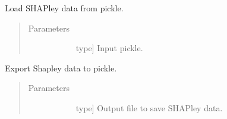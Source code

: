 \documentclass[letterpaper,10pt,english]{sphinxmanual}
\begin{document}
\begin{fulllineitems}

\begin{fulllineitems}
\label{\detokenize{index:methylnet.interpretation_classes.ShapleyData.from_pickle}}
Load SHAPley data from pickle.
\begin{quote}\begin{description}
\item[{Parameters}] \leavevmode\begin{description}
\item[{}] \leavevmode{[}type{]}
Input pickle.

\end{description}

\end{description}\end{quote}

\end{fulllineitems}


\begin{fulllineitems}
\label{\detokenize{index:methylnet.interpretation_classes.ShapleyData.to_pickle}}
Export Shapley data to pickle.
\begin{quote}\begin{description}
\item[{Parameters}] \leavevmode\begin{description}
\item[{}] \leavevmode{[}type{]}
Output file to save SHAPley data.

\end{description}

\end{description}\end{quote}

\end{fulllineitems}


\end{fulllineitems}
\end{document}
